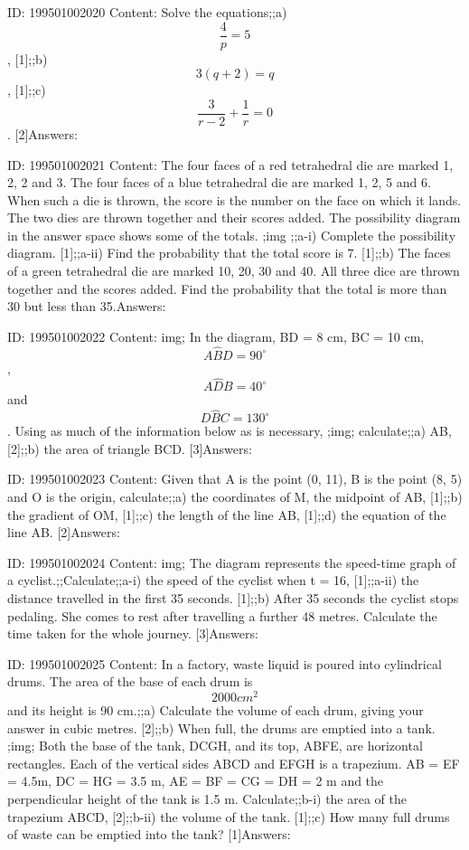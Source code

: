 \documentclass{article}
\begin{document}
ID: 199501002020
Content:
Solve the equations;;a) $$\frac{4}{p} = 5$$, [1];;b) $$3(q+ 2) = q$$ , [1];;c) $$\frac{3}{r-2} + \frac{1}{r} = 0$$. [2]Answers:

ID: 199501002021
Content:
The four faces of a red tetrahedral die are marked 1, 2, 2 and 3. The four faces of a blue tetrahedral die are marked 1, 2, 5 and 6. When such a die is thrown, the score is the number on the face on which it lands. The two dies are thrown together and their scores added. The possibility diagram in the answer space shows some of the totals. ;img ;;a-i) Complete the possibility diagram. [1];;a-ii) Find the probability that the total score is 7. [1];;b) The faces of a green tetrahedral die are marked 10, 20, 30 and 40. All three dice are thrown together and the scores added. Find the probability that the total is more than 30 but less than 35.Answers:

ID: 199501002022
Content:
img; In the diagram, BD = 8 cm, BC = 10 cm, $$A\hat BD = 90^{\circ}$$, $$A\hat DB = 40^{\circ}$$and $$D\hat BC = 130^{\circ}$$. Using as much of the information below as is necessary, ;img; calculate;;a) AB, [2];;b) the area of triangle BCD. [3]Answers:

ID: 199501002023
Content:
Given that A is the point (0, 11), B is the point (8, 5) and O is the origin, calculate;;a) the coordinates of M, the midpoint of AB, [1];;b) the gradient of OM, [1];;c) the length of the line AB, [1];;d) the equation of the line AB. [2]Answers:

ID: 199501002024
Content:
img; The diagram represents the speed-time graph of a cyclist.;;Calculate;;a-i) the speed of the cyclist when t = 16, [1];;a-ii) the distance travelled in the first 35 seconds. [1];;b) After 35 seconds the cyclist stops pedaling. She comes to rest after travelling a further 48 metres. Calculate the time taken for the whole journey. [3]Answers:

ID: 199501002025
Content:
In a factory, waste liquid is poured into cylindrical drums. The area of the base of each drum is $$2000 cm^2$$ and its height is 90 cm.;;a) Calculate the volume of each drum, giving your answer in cubic metres. [2];;b) When full, the drums are emptied into a tank. ;img; Both the base of the tank, DCGH, and its top, ABFE, are horizontal rectangles. Each of the vertical sides ABCD and EFGH is a trapezium. AB = EF = 4.5m, DC = HG = 3.5 m, AE = BF = CG = DH = 2 m and the perpendicular height of the tank is 1.5 m. Calculate;;b-i) the area of the trapezium ABCD, [2];;b-ii) the volume of the tank. [1];;c) How many full drums of waste can be emptied into the tank? [1]Answers:
\end{document}
